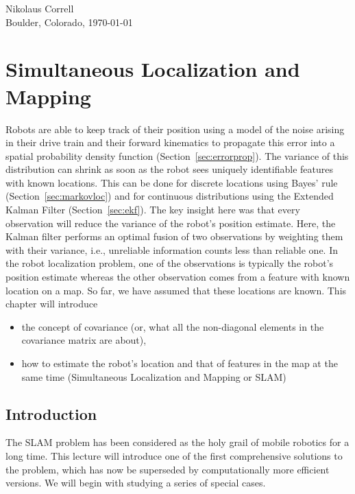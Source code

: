 \documentclass[paper=6.14in:9.21in,pagesize=pdftex,11pt,twoside,openright]{scrbook}
\begin{document}
\begin{flushright}
Nikolaus Correll\\
Boulder, Colorado, \today
\end{flushright}

















\chapter{Simultaneous Localization and Mapping}\label{chap:slam}
Robots are able to keep track of their position using a model of the noise arising in their drive train and their forward kinematics to propagate this error into a spatial probability density function (Section~\ref{sec:errorprop}). The variance of this distribution can shrink as soon as the robot sees uniquely identifiable features with known locations. This can be done for discrete locations using Bayes' rule (Section~\ref{sec:markovloc}) and for continuous distributions using the Extended Kalman Filter (Section~\ref{sec:ekf}). The key insight here was that every observation will reduce the variance of the robot's position estimate. Here, the Kalman filter performs an optimal fusion of two observations by weighting them with their variance, i.e., unreliable information counts less than reliable one. In the robot localization problem, one of the observations is typically the robot's position estimate whereas the other observation comes from a feature with known location on a map. So far, we have assumed that these locations are known. This chapter will introduce

\begin{itemize}
\item the concept of covariance (or, what all the non-diagonal elements in the covariance matrix are about),
\item how to estimate the robot's location and that of features in the map at the same time (Simultaneous Localization and Mapping or SLAM)
\end{itemize}

\section{Introduction}
The SLAM problem has been considered as the holy grail of mobile robotics for a long time. This lecture will introduce one of the first comprehensive solutions to the problem, which has now be superseded by computationally more efficient versions. We will begin with studying a series of special cases.
\end{document}
